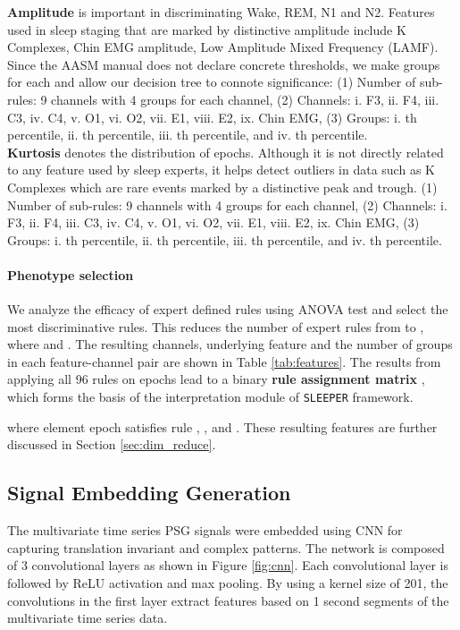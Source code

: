 \documentclass[pmlr]{jmlr}
\newcommand{\mname}
{\texttt{SLEEPER}\xspace}
\begin{document}
\noindent\textbf{Amplitude} is important in discriminating Wake, REM, N1 and N2. Features used in sleep staging that are marked by distinctive amplitude include K Complexes, Chin EMG amplitude, Low Amplitude Mixed Frequency (LAMF). Since the AASM manual \citep{berry2012aasm} does not declare concrete thresholds, we make groups for each and allow our decision tree to connote significance: (1) Number of sub-rules: 9 channels with 4 groups for each channel, (2) Channels: i. F3, ii. F4, iii. C3, iv. C4, v. O1, vi. O2, vii. E1, viii. E2, ix. Chin EMG, (3) Groups: i. th percentile, ii. th percentile, iii. th percentile, and iv. th percentile.\\

\noindent\textbf{Kurtosis} denotes the distribution of epochs. Although it is not directly related to any feature used by sleep experts, it helps detect outliers in data such as K Complexes which are rare events marked by a distinctive peak and trough. (1) Number of sub-rules: 9 channels with 4 groups for each channel, (2) Channels: i. F3, ii. F4, iii. C3, iv. C4, v. O1, vi. O2, vii. E1, viii. E2, ix. Chin EMG, (3) Groups: i. th percentile, ii. th percentile, iii. th percentile, and iv. th percentile.

\paragraph{Phenotype selection} We analyze the efficacy of expert defined rules using ANOVA test and select the most discriminative rules.  This reduces the number of expert rules from  to , where  and . The resulting channels, underlying feature and the number of groups in each feature-channel pair are shown in Table \ref{tab:features}.  The results from applying all 96 rules on  epochs lead to a binary {\bf rule assignment matrix} , which  forms the basis of the interpretation module of \mname framework. 

where element  epoch  satisfies rule , , and . These resulting features are further discussed in Section \ref{sec:dim_reduce}.

\subsection{Signal Embedding Generation}
The multivariate time series PSG signals were embedded using CNN for capturing translation invariant and complex patterns. The network is composed of 3 convolutional layers as shown in Figure \ref{fig:cnn}. Each convolutional layer is followed by ReLU activation and max pooling. By using a kernel size of 201, the convolutions in the first layer extract features based on 1 second segments of the multivariate time series data.
\end{document}
